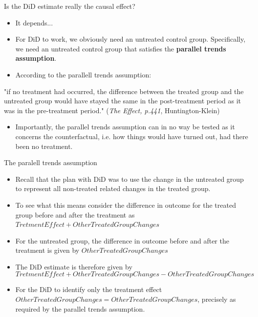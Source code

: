 \documentclass[notes,11pt, aspectratio=169]{beamer}
\begin{document}
\begin{frame}{Is the DiD estimate really the causal effect?}
\begin{itemize}
    \item It depends... 

    \item For DiD to work, we obviously need an untreated control group. Specifically, we need an untreated control group that satisfies the \textbf{parallel trends assumption}.

    \item According to the parallell trends assumption:
\end{itemize}
  \begin{displayquote}
"if no treatment had occurred, the difference between the treated group and the untreated group would have stayed the same in the post-treatment period as it was in the pre-treatment period."
\flushright\tiny (\emph{The Effect, p.441}, Huntington-Klein)
\end{displayquote}
\begin{itemize}
    \item Importantly, the parallel trends assumption can in no way be tested as it concerns the counterfactual, i.e. how things would have turned out, had there been no treatment.
\end{itemize}
\end{frame}

\begin{frame}{The paralell trends assumption}
\begin{itemize}
    \item Recall that the plan with DiD was to use the change in the untreated group to represent all non-treated related changes in the treated group. 
    \item To see what this means consider the difference in outcome for the treated group before and after the treatment as $TretmentEffect + OtherTreatedGroupChanges$    
    \item For the untreated group, the difference in outcome before and after the treatment is given by $OtherTreatedGroupChanges$
    \item The DiD estimate is therefore given by
\begin{equation}
TretmentEffect + OtherTreatedGroupChanges - OtherTreatedGroupChanges
\end{equation}
    \item For the DiD to identify only the treatment effect $OtherTreatedGroupChanges = OtherTreatedGroupChanges$, precisely as required by the parallel trends assumption.
\end{itemize}
\end{frame}
\end{document}
